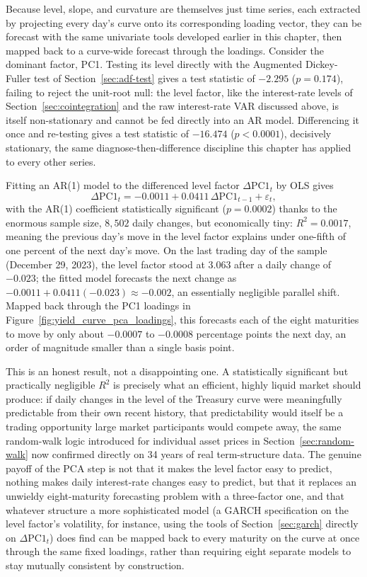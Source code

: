 \documentclass[../ai_in_finance]{subfiles}
\begin{document}
Because level, slope, and curvature are themselves just time series, each extracted by projecting every day's curve onto its corresponding loading vector, they can be forecast with the same univariate tools developed earlier in this chapter, then mapped back to a curve-wide forecast through the loadings. Consider the dominant factor, PC1. Testing its level directly with the Augmented Dickey-Fuller test of Section~\ref{sec:adf-test} gives a test statistic of $-2.295$ ($p = 0.174$), failing to reject the unit-root null: the level factor, like the interest-rate levels of Section~\ref{sec:cointegration} and the raw interest-rate VAR discussed above, is itself non-stationary and cannot be fed directly into an AR model.
Differencing it once and re-testing gives a test statistic of $-16.474$ ($p < 0.0001$), decisively stationary, the same diagnose-then-difference discipline this chapter has applied to every other series.

Fitting an AR(1) model to the differenced level factor $\Delta\text{PC1}_t$ by OLS gives
\begin{equation*}
\Delta\text{PC1}_t = -0.0011 + 0.0411\,\Delta\text{PC1}_{t-1} + \varepsilon_t,
\end{equation*}
with the AR(1) coefficient statistically significant ($p = 0.0002$) thanks to the enormous sample size, $8{,}502$ daily changes, but economically tiny: $R^2 = 0.0017$, meaning the previous day's move in the level factor explains under one-fifth of one percent of the next day's move.
On the last trading day of the sample (December 29, 2023), the level factor stood at $3.063$ after a daily change of $-0.023$; the fitted model forecasts the next change as $-0.0011 + 0.0411(-0.023) \approx -0.002$, an essentially negligible parallel shift. Mapped back through the PC1 loadings in Figure~\ref{fig:yield_curve_pca_loadings}, this forecasts each of the eight maturities to move by only about $-0.0007$ to $-0.0008$ percentage points the next day, an order of magnitude smaller than a single basis point.

This is an honest result, not a disappointing one. A statistically significant but practically negligible $R^2$ is precisely what an efficient, highly liquid market should produce: if daily changes in the level of the Treasury curve were meaningfully predictable from their own recent history, that predictability would itself be a trading opportunity large market participants would compete away, the same random-walk logic introduced for individual asset prices in Section~\ref{sec:random-walk} now confirmed directly on 34 years of real term-structure data.
The genuine payoff of the PCA step is not that it makes the level factor easy to predict, nothing makes daily interest-rate changes easy to predict, but that it replaces an unwieldy eight-maturity forecasting problem with a three-factor one, and that whatever structure a more sophisticated model (a GARCH specification on the level factor's volatility, for instance, using the tools of Section~\ref{sec:garch} directly on $\Delta\text{PC1}_t$) does find can be mapped back to every maturity on the curve at once through the same fixed loadings, rather than requiring eight separate models to stay mutually consistent by construction.
\end{document}
